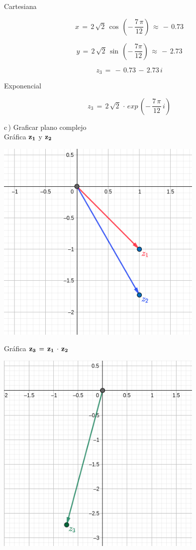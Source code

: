 \documentclass[a4paper,11pt,openany]{book}
\begin{document}
\textcolor{ao(english)}{} Cartesiana

$$x\,=\,2\,\sqrt{2}\,\cos\,\left(-\,\dfrac{7\,\pi}{12}\right)\,\approx\,-\,0.73$$

$$y\,=\,2\,\sqrt{2}\,\sin\,\left(-\,\dfrac{7\pi}{12}\right)\,\approx\,-\,2.73$$

$$z_{3}\,=\,-\,0.73\,-\,2.73\,i$$

\textcolor{ao(english)}{} Exponencial

$$z_{3}\,=\,2\,\sqrt{2}\,\cdot\,exp\,\left(-\,\dfrac{7\,\pi}{12}\,i\right)$$

\textcolor{ao(english)}{c\,)} Graficar plano complejo\\

\textcolor{ao(english)}{} Gráfica $\bf{z_{1}}$ y $\bf{z_{2}}$

\begin{center}
    \includegraphics[width=10cm]{Gra-Ej-3-1.png}
\end{center}

\newpage

\textcolor{ao(english)}{} Gráfica $\bf{z_{3}\,=\,z_{1}\,\cdot\,z_{2}}$

\begin{center}
    \includegraphics[width=10cm]{Gra-Ej-3-2.png}
\end{center}
\end{document}
